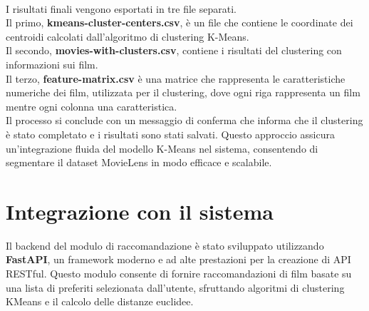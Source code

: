 \documentclass[a4paper,12pt]{article}
\begin{document}
\\I risultati finali vengono esportati in tre file separati.\\
Il primo, \textbf{kmeans-cluster-centers.csv}, è un file che contiene le coordinate dei centroidi calcolati dall'algoritmo di clustering K-Means.\\Il secondo, \textbf{movies-with-clusters.csv},  contiene i risultati del clustering con informazioni sui film.\\Il terzo, \textbf{feature-matrix.csv} è una matrice che rappresenta le caratteristiche numeriche dei film, utilizzata per il clustering, dove ogni riga rappresenta un film mentre ogni colonna una caratteristica.\\
Il processo si conclude con un messaggio di conferma che informa che il clustering è stato completato e i risultati sono stati salvati. Questo approccio assicura un'integrazione fluida del modello K-Means nel sistema, consentendo di segmentare il dataset MovieLens in modo efficace e scalabile.
\section{Integrazione con il sistema}
Il backend del modulo di raccomandazione è stato sviluppato utilizzando \textbf{FastAPI}, un framework moderno e ad alte prestazioni per la creazione di API RESTful. Questo modulo consente di fornire raccomandazioni di film basate su una lista di preferiti selezionata dall'utente, sfruttando algoritmi di clustering KMeans e il calcolo delle distanze euclidee.
\end{document}
